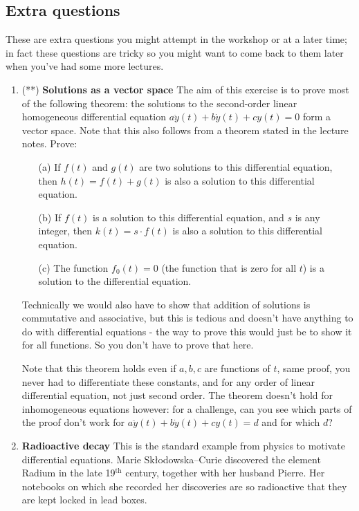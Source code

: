 \documentclass[11pt,a4paper]{scrartcl}
\begin{document}
\subsection*{Extra questions}

These are extra questions you might attempt in the workshop or at a
later time; in fact these questions are tricky so you might want to
come back to them later when you've had some more lectures.

\begin{enumerate}

	
	\item (**) \textbf{Solutions as a vector space}	
	The aim of this exercise is to prove most of the following theorem:
	the solutions to the second-order linear homogeneous differential equation
	$a\ddot{y}(t) + b\dot{y}(t) + cy(t) = 0$ form a vector space. Note that this also follows from a theorem stated in the lecture notes. Prove:
	\begin{itemize}
		\item[(a)] If $f(t)$ and $g(t)$ are two solutions to this differential equation, then $h(t) = f(t) + g(t)$ is also a solution to this differential equation.
		\item[(b)] If $f(t)$ is a solution to this differential equation,
		and $s$ is any integer, then $k(t) = s \cdot f(t)$ is also a solution to this differential equation.
		\item[(c)] The function $f_0(t) = 0$ (the function that is zero for all $t$) is a solution to the differential equation.
	\end{itemize}
	Technically we would also have to show that addition of
        solutions is commutative and associative, but this is tedious
        and doesn't have anything to do with differential equations -
        the way to prove this would just be to show it for all
        functions. So you don't have to prove that here.
	
	Note that this theorem holds even if $a,b,c$ are functions of
        $t$, same proof, you never had to differentiate these
        constants, and for any order of linear differential equation,
        not just second order. The theorem doesn't hold for
        inhomogeneous equations however: for a challenge, can
        you see which parts of the proof don't work for $a\ddot{y}(t) +
        b\dot{y}(t) + cy(t) = d$ and for which $d$?
	
	\item \textbf{Radioactive decay}
	This is the standard example from physics to motivate differential equations.
	Marie Sk\l{}odowska–Curie discovered the element Radium in the late 19$^\text{th}$ century, together with her husband Pierre. Her notebooks on which she recorded her discoveries are so radioactive that they are kept locked in lead boxes.
	

\end{enumerate}
\end{document}
